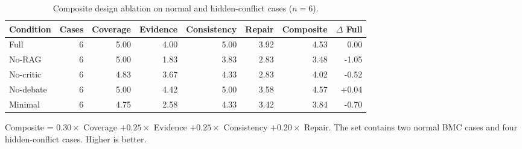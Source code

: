 \begin{table}[htbp]
\centering
\begin{threeparttable}
\caption{Composite design ablation on normal and hidden-conflict cases ($n=6$).}
\label{tab:composite-ablation}
\begin{tabular}{lrrrrrrr}
\toprule
Condition & Cases & Coverage & Evidence & Consistency & Repair & Composite & $\Delta$ Full \\
\midrule
Full & 6 & 5.00 & 4.00 & 5.00 & 3.92 & 4.53 & 0.00 \\
No-RAG & 6 & 5.00 & 1.83 & 3.83 & 2.83 & 3.48 & -1.05 \\
No-critic & 6 & 4.83 & 3.67 & 4.33 & 2.83 & 4.02 & -0.52 \\
No-debate & 6 & 5.00 & 4.42 & 5.00 & 3.58 & 4.57 & +0.04 \\
Minimal & 6 & 4.75 & 2.58 & 4.33 & 3.42 & 3.84 & -0.70 \\
\bottomrule
\end{tabular}
\begin{tablenotes}
\small
\item Composite = $0.30 \times$ Coverage $+ 0.25 \times$ Evidence $+ 0.25 \times$ Consistency $+ 0.20 \times$ Repair. The set contains two normal BMC cases and four hidden-conflict cases. Higher is better.
\end{tablenotes}
\end{threeparttable}
\end{table}
